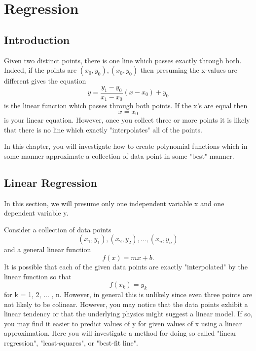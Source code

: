 \documentclass[10pt,]{book}
\theoremstyle{plain}
\theoremstyle{definition}
\theoremstyle{definition}
\theoremstyle{definition}
\numberwithin{equation}{section}
\begin{document}
\chapter[{Regression}]{Regression}\label{CurveEstimation}
\typeout{************************************************}
\typeout{************************************************}
\section[{Introduction}]{Introduction}\label{section-10}

Given two distinct points, there is one line which passes exactly through both.  Indeed, if the points are \((x_0,y_0), (x_0,y_0)\) then presuming the x-values are different gives the equation
\begin{equation*} y = \frac{y_1 - y_0}{x_1 - x_0}(x - x_0) + y_0\end{equation*}
is the linear function which passes through both points.  If the x's are equal then 
\begin{equation*} x = x_0\end{equation*}
is your linear equation. 
However, once you collect three or more points it is likely that there is no line which exactly "interpolates" all of the points.
%
\par

In this chapter, you will investigate how to create polynomial functions which in some manner approximate a collection of data point in some "best" manner.
%
\typeout{************************************************}
\typeout{************************************************}
\section[{Linear Regression}]{Linear Regression}\label{section-11}

In this section, we will presume only one independent variable x and one dependent variable y.
%
\par

Consider a collection of data points 
\begin{equation*}(x_1,y_1), (x_2,y_2), ... , (x_n,y_n)\end{equation*}
and a general linear function 
\begin{equation*}f(x) = mx + b.\end{equation*}
It is possible that each of the given data points are exactly "interpolated" by the linear function so that
\begin{equation*}f(x_k) = y_k\end{equation*}
for k = 1, 2, ... , n.  However, in general this is unlikely since even three points are not likely to be colinear. However, you may notice that the data points exhibit a linear tendency or that the underlying physics might suggest a linear model. If so, you may find it easier to predict values of y for given values of x using a linear approximation. Here you will investigate a method for doing so called "linear regression", "least-squares", or "best-fit line".
%
\par
\end{document}
